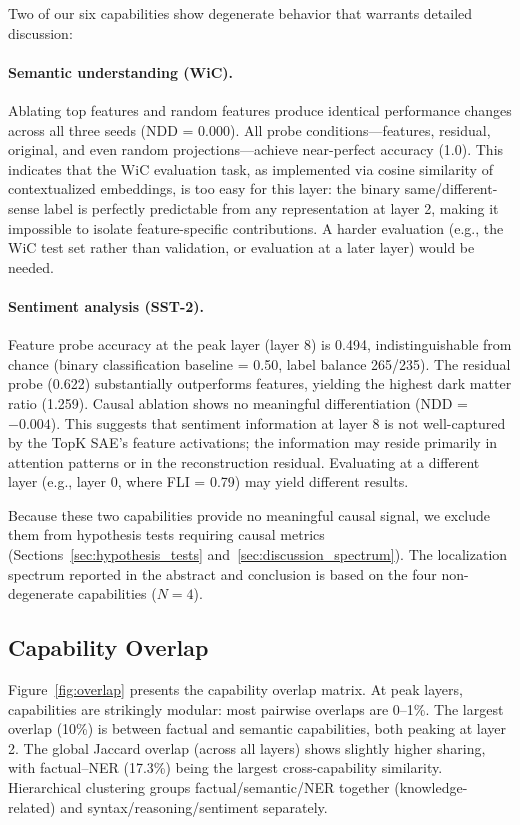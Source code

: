 \documentclass{article}
\begin{document}
Two of our six capabilities show degenerate behavior that warrants detailed discussion:

\paragraph{Semantic understanding (WiC).} Ablating top features and random features produce identical performance changes across all three seeds (NDD = 0.000). All probe conditions---features, residual, original, and even random projections---achieve near-perfect accuracy (1.0). This indicates that the WiC evaluation task, as implemented via cosine similarity of contextualized embeddings, is too easy for this layer: the binary same/different-sense label is perfectly predictable from any representation at layer 2, making it impossible to isolate feature-specific contributions. A harder evaluation (e.g., the WiC test set rather than validation, or evaluation at a later layer) would be needed.

\paragraph{Sentiment analysis (SST-2).} Feature probe accuracy at the peak layer (layer 8) is 0.494, indistinguishable from chance (binary classification baseline = 0.50, label balance 265/235). The residual probe (0.622) substantially outperforms features, yielding the highest dark matter ratio (1.259). Causal ablation shows no meaningful differentiation (NDD = $-0.004$). This suggests that sentiment information at layer 8 is not well-captured by the TopK SAE's feature activations; the information may reside primarily in attention patterns or in the reconstruction residual. Evaluating at a different layer (e.g., layer 0, where FLI = 0.79) may yield different results.

Because these two capabilities provide no meaningful causal signal, we exclude them from hypothesis tests requiring causal metrics (Sections~\ref{sec:hypothesis_tests} and~\ref{sec:discussion_spectrum}). The localization spectrum reported in the abstract and conclusion is based on the four non-degenerate capabilities ($N = 4$).

\subsection{Capability Overlap}

Figure~\ref{fig:overlap} presents the capability overlap matrix. At peak layers, capabilities are strikingly modular: most pairwise overlaps are 0--1\%. The largest overlap (10\%) is between factual and semantic capabilities, both peaking at layer 2. The global Jaccard overlap (across all layers) shows slightly higher sharing, with factual--NER (17.3\%) being the largest cross-capability similarity. Hierarchical clustering groups factual/semantic/NER together (knowledge-related) and syntax/reasoning/sentiment separately.
\end{document}
